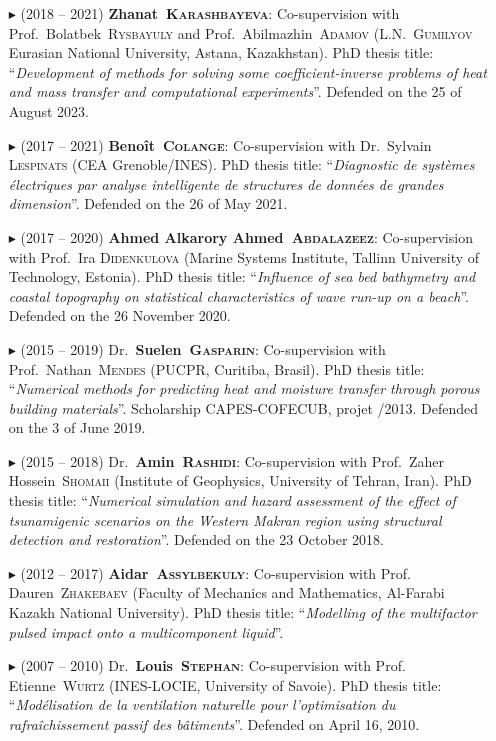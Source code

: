 \begin{itemize}
            \item[$\blacktriangleright$] (2018 -- 2021) \textbf{Zhanat~\textsc{Karashbayeva}}: Co-supervision with Prof.~Bolatbek~\textsc{Rysbayuly} and Prof.~Abilmazhin~\textsc{Adamov} (L.N.~\textsc{Gumilyov} Eurasian National University, Astana, Kazakhstan). PhD thesis title: ``\textit{Development of methods for solving some coefficient-inverse problems of heat and mass transfer and computational experiments}''. Defended on the 25 of August 2023.
            \item[$\blacktriangleright$] (2017 -- 2021) \textbf{Beno\^it~\textsc{Colange}}: Co-supervision with Dr.~Sylvain \textsc{Lespinats} (CEA Grenoble/INES). PhD thesis title: ``\textit{Diagnostic de syst\`emes \'electriques par analyse intelligente de structures de donn\'ees de grandes dimension}''. Defended on the 26 of May 2021.
            \item[$\blacktriangleright$] (2017 -- 2020) \textbf{Ahmed Alkarory Ahmed~\textsc{Abdalazeez}}: Co-supervision with Prof.~Ira \textsc{Didenkulova} (Marine Systems Institute, Tallinn University of Technology, Estonia). PhD thesis title: ``\textit{Influence of sea bed bathymetry and coastal topography on statistical characteristics of wave run-up on a beach}''. Defended on the 26 November 2020.
            \item[$\blacktriangleright$] (2015 -- 2019) Dr.~\textbf{Suelen~\textsc{Gasparin}}: Co-supervision with Prof.~Nathan~\textsc{Mendes} (PUCPR, Curitiba, Brasil). PhD thesis title: ``\textit{Numerical methods for predicting heat and moisture transfer through porous building materials}''. Scholarship CAPES-COFECUB, projet /2013. Defended on the 3 of June 2019.
            \item[$\blacktriangleright$] (2015 -- 2018) Dr.~\textbf{Amin~\textsc{Rashidi}}: Co-supervision with Prof.~Zaher Hossein~\textsc{Shomaii} (Institute of Geophysics, University of Tehran, Iran). PhD thesis title: ``\textit{Numerical simulation and hazard assessment of the effect of tsunamigenic scenarios on the Western Makran region using structural detection and restoration}''. Defended on the 23 October 2018.
            \item[$\blacktriangleright$] (2012 -- 2017) \textbf{Aidar~\textsc{Assylbekuly}}: Co-supervision with Prof. Dauren~\textsc{Zhakebaev} (Faculty of Mechanics and Mathematics, Al-Farabi Kazakh National University). PhD thesis title: ``\textit{Modelling of the multifactor pulsed impact onto a multicomponent liquid}''.
            \item[$\blacktriangleright$] (2007 -- 2010) Dr.~\textbf{Louis~\textsc{Stephan}}: Co-supervision with Prof. Etienne~\textsc{Wurtz} (INES-LOCIE, University of Savoie). PhD thesis title: ``\textit{Mod\'elisation de la ventilation naturelle pour l'optimisation du rafra\^ichissement passif des b\^atiments}''. Defended on April 16, 2010.
        \end{itemize}

